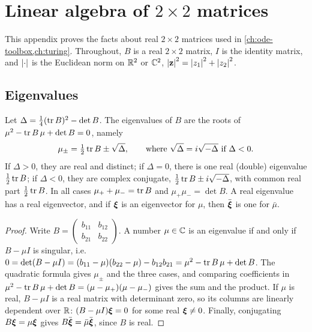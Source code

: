 \chapter{Linear algebra of \texorpdfstring{$2\times 2$}{2x2} matrices}\label{app:linear-algebra}

This appendix proves the facts about real $2\times2$ matrices used in
\cref{ch:ode-toolbox,ch:turing}. Throughout, $B$ is a real $2\times2$ matrix, $I$
is the identity matrix, and $\left\lvert \cdot\right\rvert$ is the Euclidean norm on $\mathbb{R}^2$ or
$\mathbb{C}^2$, $\left\lvert \mathbf z\right\rvert^2=\left\lvert z_1\right\rvert^2+\left\lvert z_2\right\rvert^2$.

\section{Eigenvalues}\label{sec:linalg-eigenvalues}

\begin{proposition}\label{prop:2x2-eigenvalues}
Let $\Delta=\frac14(\operatorname{tr} B)^2-\det B$. The eigenvalues of $B$ are the roots of
$\mu^2-\operatorname{tr} B\,\mu+\det B=0$, namely
\begin{equation*}
  \mu_\pm=\tfrac12\operatorname{tr} B\pm\sqrt{\Delta},
  \qquad\text{where } \sqrt{\Delta}=i\sqrt{-\Delta} \text{ if } \Delta<0 .
\end{equation*}
If $\Delta>0$, they are real and distinct; if $\Delta=0$, there is one real
(double) eigenvalue $\frac12\operatorname{tr} B$; if $\Delta<0$, they are complex conjugate,
$\frac12\operatorname{tr} B\pm i\sqrt{-\Delta}$, with common real part $\frac12\operatorname{tr} B$. In all
cases $\mu_++\mu_-=\operatorname{tr} B$ and $\mu_+\mu_-=\det B$. A real eigenvalue has a real
eigenvector, and if $\boldsymbol{\xi}$ is an eigenvector for $\mu$, then $\bar{\boldsymbol{\xi}}$ is one for
$\bar\mu$.
\end{proposition}

\begin{proof}
Write $B=\left(\begin{smallmatrix}b_{11}&b_{12}\\b_{21}&b_{22}\end{smallmatrix}\right)$.
A number $\mu\in\mathbb{C}$ is an eigenvalue if and only if $B-\mu I$ is singular, i.e.\
$0=\det(B-\mu I)=(b_{11}-\mu)(b_{22}-\mu)-b_{12}b_{21}=\mu^2-\operatorname{tr} B\,\mu+\det B$.
The quadratic formula gives $\mu_\pm$ and the three cases, and comparing
coefficients in $\mu^2-\operatorname{tr} B\,\mu+\det B=(\mu-\mu_+)(\mu-\mu_-)$ gives the sum and
the product. If $\mu$ is real, $B-\mu I$ is a real matrix with determinant zero,
so its columns are linearly dependent over $\mathbb{R}$: $(B-\mu I)\boldsymbol{\xi}=0$ for some real
$\boldsymbol{\xi}\neq0$. Finally, conjugating $B\boldsymbol{\xi}=\mu\boldsymbol{\xi}$ gives $B\bar{\boldsymbol{\xi}}=\bar\mu\bar{\boldsymbol{\xi}}$,
since $B$ is real.
\end{proof}

